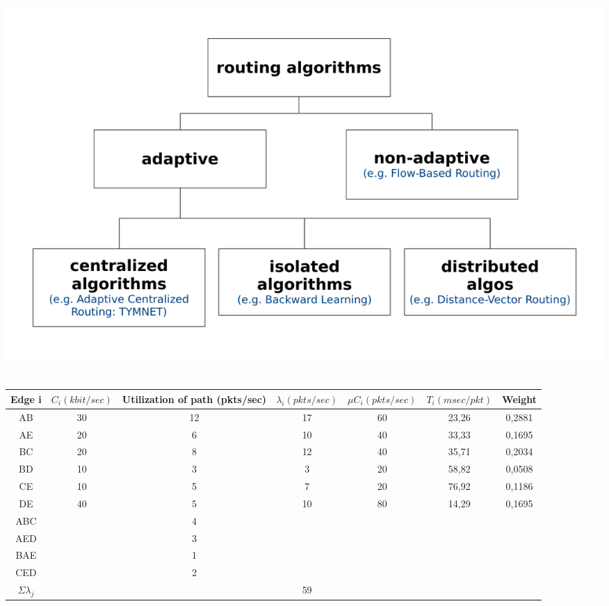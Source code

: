 \documentclass[a4paper,
			llpt,
			solution,
			accentcolor=tud2d,
			colorbacktitle
			]
			{tudexercise}
\begin{document}
\section{}
\subsection{}
  \begin{center}
    \includegraphics[scale=0.6]{2_3_1.pdf}
  \end{center}

\subsection{}
\begin{center}
\begin{tabular}{|c|c|c|c|c|c|c|}
\hline
Edge i
&
$C_{i} (kbit/sec)$
&
Utilization of path (pkts/sec)
&
$\lambda_{i}(pkts/sec)$
&
$\mu C_{i}(pkts/sec)$
&
$T_{i}(msec/pkt)$
&
Weight
\\ \hline
AB & 30 & 12 & 17 & 60 & 23,26 & 0,2881 \\ \hline
AE & 20 & 6 & 10 & 40 & 33,33 & 0,1695 \\ \hline
BC & 20 & 8 & 12 & 40 & 35,71 & 0,2034 \\ \hline
BD & 10 & 3 & 3 & 20 & 58,82 & 0,0508 \\ \hline
CE & 10 & 5 & 7 & 20 & 76,92 & 0,1186 \\ \hline
DE & 40 & 5 & 10 & 80 & 14,29 & 0,1695 \\ \hline
ABC &   & 4 &    &    &       &\\ \hline
AED &   & 3 &    &    &       &\\ \hline
BAE &   & 1 &    &    &       &\\ \hline
CED &   & 2 &    &    &       &\\ \hline
$\Sigma \lambda _{j}$ & & & 59 & & & \\ \hline
\end{tabular}
\end{center}
\end{document}
